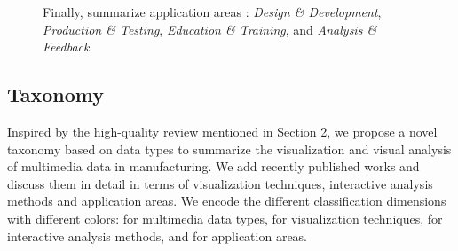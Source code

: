 \documentclass[a4paper,fleqn]{cas-dc}
\begin{document}
\begin{figure}[pos=!h]
{		%
		Finally, summarize application areas : \textit{Design \& Development}, \textit{Production \& Testing}, \textit{Education \& Training}, and \textit{Analysis \& Feedback}.
	}
	\vspace{-2em}
	\label{fig:table}
\end{figure}

\subsection{Taxonomy}
Inspired by the high-quality review mentioned in Section 2, we propose a novel taxonomy based on data types to summarize the visualization and visual analysis of multimedia data in manufacturing.
We add recently published works and discuss them in detail in terms of visualization techniques, interactive analysis methods and application areas.
We encode the different classification dimensions with different colors:
 for multimedia data types, 
 for visualization techniques, 
 for interactive analysis methods, and 
 for application areas.
\end{document}
